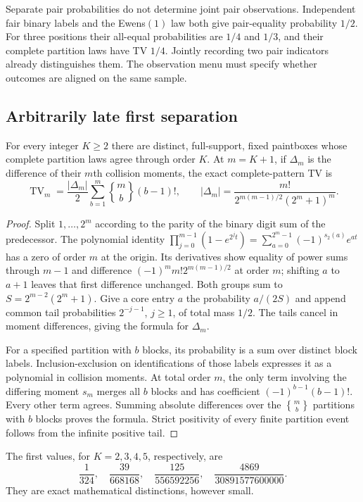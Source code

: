 Separate pair probabilities do not determine joint pair observations. Independent fair binary labels and the Ewens$(1)$ law both give pair-equality probability $1/2$. For three positions their all-equal probabilities are $1/4$ and $1/3$, and their complete partition laws have TV $1/4$. Jointly recording two pair indicators already distinguishes them. The observation menu must specify whether outcomes are aligned on the same sample.

\subsection{Arbitrarily late first separation}
\label{pat:prouhet}
\begin{theorem}
For every integer $K\ge2$ there are distinct, full-support, fixed paintboxes whose complete partition laws agree through order $K$. At $m=K+1$, if $\Delta_m$ is the difference of their $m$th collision moments, the exact complete-pattern TV is
\[
 \operatorname{TV}_m=\frac{|\Delta_m|}{2}
 \sum_{b=1}^m {m\brace b}(b-1)!,\qquad
 |\Delta_m|=\frac{m!}{2^{m(m-1)/2}(2^m+1)^m}.
\]
\end{theorem}
\begin{proof}
Split $1,\ldots,2^m$ according to the parity of the binary digit sum of the predecessor. The polynomial identity
$\prod_{j=0}^{m-1}(1-e^{2^jt})=\sum_{a=0}^{2^m-1}(-1)^{s_2(a)}e^{at}$
has a zero of order $m$ at the origin. Its derivatives show equality of power sums through $m-1$ and difference $(-1)^m m!2^{m(m-1)/2}$ at order $m$; shifting $a$ to $a+1$ leaves that first difference unchanged. Both groups sum to $S=2^{m-2}(2^m+1)$. Give a core entry $a$ the probability $a/(2S)$ and append common tail probabilities $2^{-j-1}$, $j\ge1$, of total mass $1/2$. The tails cancel in moment differences, giving the formula for $\Delta_m$.

For a specified partition with $b$ blocks, its probability is a sum over distinct block labels. Inclusion-exclusion on identifications of those labels expresses it as a polynomial in collision moments. At total order $m$, the only term involving the differing moment $s_m$ merges all $b$ blocks and has coefficient $(-1)^{b-1}(b-1)!$. Every other term agrees. Summing absolute differences over the ${m\brace b}$ partitions with $b$ blocks proves the formula. Strict positivity of every finite partition event follows from the infinite positive tail.
\end{proof}
The first values, for $K=2,3,4,5$, respectively, are
\[\frac1{324},\quad\frac{39}{668168},\quad\frac{125}{556592256},\quad\frac{4869}{30891577600000}.\]
They are exact mathematical distinctions, however small.


